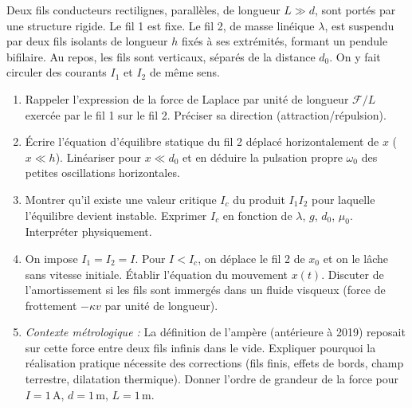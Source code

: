 \documentclass[11pt]{article}
\begin{document}
\begin{exercice}
Deux fils conducteurs rectilignes, parallèles, de longueur $L \gg d$, sont portés par une structure rigide. Le fil 1 est fixe. Le fil 2, de masse linéique $\lambda$, est suspendu par deux fils isolants de longueur $h$ fixés à ses extrémités, formant un pendule bifilaire. Au repos, les fils sont verticaux, séparés de la distance $d_0$. On y fait circuler des courants $I_1$ et $I_2$ de même sens.
\begin{enumerate}
    \item Rappeler l'expression de la force de Laplace par unité de longueur $\mathcal{F}/L$ exercée par le fil 1 sur le fil 2. Préciser sa direction (attraction/répulsion).
    \item Écrire l'équation d'équilibre statique du fil 2 déplacé horizontalement de $x$ ($x \ll h$). Linéariser pour $x \ll d_0$ et en déduire la pulsation propre $\omega_0$ des petites oscillations horizontales.
    \item Montrer qu'il existe une valeur critique $I_c$ du produit $I_1 I_2$ pour laquelle l'équilibre devient instable. Exprimer $I_c$ en fonction de $\lambda$, $g$, $d_0$, $\mu_0$. Interpréter physiquement.
    \item On impose $I_1 = I_2 = I$. Pour $I < I_c$, on déplace le fil 2 de $x_0$ et on le lâche sans vitesse initiale. Établir l'équation du mouvement $x(t)$. Discuter de l'amortissement si les fils sont immergés dans un fluide visqueux (force de frottement $-\kappa v$ par unité de longueur).
    \item \textit{Contexte métrologique :} La définition de l'ampère (antérieure à 2019) reposait sur cette force entre deux fils infinis dans le vide. Expliquer pourquoi la réalisation pratique nécessite des corrections (fils finis, effets de bords, champ terrestre, dilatation thermique). Donner l'ordre de grandeur de la force pour $I=1\,\text{A}$, $d=1\,\text{m}$, $L=1\,\text{m}$.
\end{enumerate}
\end{exercice}
\end{document}
